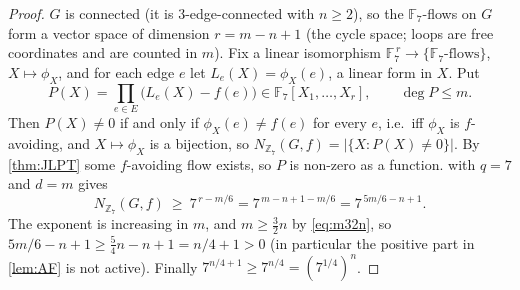 \documentclass[11pt,a4paper]{article}
\theoremstyle{plain}
\theoremstyle{definition}
\theoremstyle{remark}
\newcommand{\F}{{\mathbb F}}
\newcommand{\Z}{{\mathbb Z}}
\newcommand{\Nf}{N}
\begin{document}
\label{pf:z7}
\propseven*
\begin{proof}
$G$ is connected (it is $3$-edge-connected with $n\ge2$), so the $\F_7$-flows on $G$ form a vector space of dimension $r=m-n+1$ (the cycle space; loops are free coordinates and are counted in $m$). Fix a linear isomorphism $\F_7^{\,r}\to\{\F_7\text{-flows}\}$, $X\mapsto\phi_X$, and for each edge $e$ let $L_e(X)=\phi_X(e)$, a linear form in $X$. Put
\[
 P(X)=\prod_{e\in E}\bigl(L_e(X)-f(e)\bigr)\in\F_7[X_1,\dots,X_r],\qquad\deg P\le m .
\]
Then $P(X)\ne0$ if and only if $\phi_X(e)\ne f(e)$ for every $e$, i.e.\ iff $\phi_X$ is $f$-avoiding, and $X\mapsto\phi_X$ is a bijection, so $\Nf_{\Z_7}(G,f)=|\{X:P(X)\ne0\}|$. By \cref{thm:JLPT} some $f$-avoiding flow exists, so $P$ is non-zero as a function.  with $q=7$ and $d=m$ gives
\[
 \Nf_{\Z_7}(G,f)\ \ge\ 7^{\,r-m/6}=7^{\,m-n+1-m/6}=7^{\,5m/6-n+1}.
\]
The exponent is increasing in $m$, and $m\ge\frac32n$ by \eqref{eq:m32n}, so $5m/6-n+1\ge\frac54n-n+1=n/4+1>0$ (in particular the positive part in \cref{lem:AF} is not active). Finally $7^{n/4+1}\ge7^{n/4}=(7^{1/4})^n$.
\end{proof}
\end{document}
